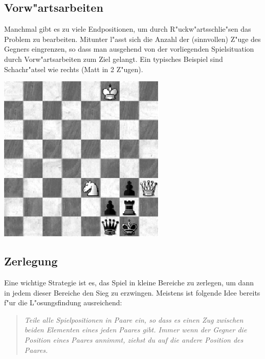 \documentclass[a4paper,11pt]{article}
\begin{document}
\subsection{Vorw"artsarbeiten}
\begin{minipage}{.6\textwidth}
Manchmal gibt es zu viele Endpositionen, um durch R"uckw"artsschlie"sen das
Problem zu bearbeiten. Mitunter l"asst sich die Anzahl der (sinnvollen) Z"uge
des Gegners eingrenzen, so dass man ausgehend von der vorliegenden
Spielsituation durch Vorw"artsarbeiten zum Ziel gelangt. Ein typisches
Beispiel sind Schachr"atsel wie rechts (Matt in 2 Z"ugen).
\end{minipage}\hfill
\begin{minipage}{.35\textwidth}
\includegraphics[width=.8\textwidth]{bauer-06-1/bauer-06-1.eps}
\end{minipage}

\subsection{Zerlegung}
Eine wichtige Strategie ist es, das Spiel in kleine Bereiche zu zerlegen, um
dann in jedem dieser Bereiche den Sieg zu erzwingen.  Meistens ist folgende
Idee bereits f"ur die L"osungsfindung ausreichend: 
\begin{quote}\it
  Teile alle Spielpositionen in Paare ein, so dass es einen Zug zwischen
  beiden Elementen eines jeden Paares gibt. Immer wenn der Gegner die Position
  eines Paares annimmt, ziehst du auf die andere Position des Paares.
\end{quote}
\end{document}
